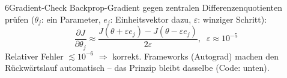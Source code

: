 \begin{hngrid}
%
\begin{hnp}[raster multicolumn=3,acc=hnteal]{6}{Gradient-Check}
Backprop-Gradient gegen zentralen Differenzenquotienten prüfen ($\theta_j$: ein Parameter, $e_j$: Einheitsvektor dazu, $\varepsilon$: winziger Schritt):
\[ \frac{\partial J}{\partial\theta_j}\approx\frac{J(\theta+\varepsilon e_j)-J(\theta-\varepsilon e_j)}{2\varepsilon},\;\;\varepsilon\approx10^{-5} \]
Relativer Fehler $\lesssim10^{-6}$ $\Rightarrow$ korrekt. Frameworks (Autograd) machen den Rückwärtslauf automatisch -- das Prinzip bleibt dasselbe (Code: unten).
\end{hnp}
%
\end{hngrid}
